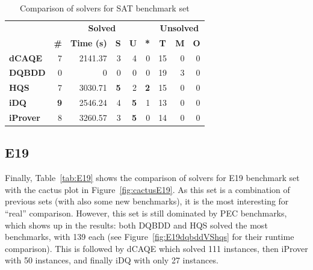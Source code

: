 \documentclass[
  digital, %
  color,
  twoside, %
  table,   %
  nolof,     %
  nolot,     %
]{fithesis3}
\theoremstyle{definition}
\theoremstyle{remark}
\begin{document}
\begin{table}[ht]
\centering
\caption{Comparison of solvers for SAT benchmark set}%
\label{tab:SAT}
\begin{tabular}{|l|r|r|r|r|r|r|r|r|}
\hline
\multicolumn{1}{|c|}{}                                  & \multicolumn{5}{c|}{\textbf{Solved}}                                                                                                                                        & \multicolumn{3}{c|}{\textbf{Unsolved}}                                                                 \\  \hhline{~*{8}{-}}
\multicolumn{1}{|c|}{\multirow{-2}{*}{\textbf{Solver}}} & \multicolumn{1}{c|}{\textbf{\#}} & \multicolumn{1}{c|}{\textbf{Time (s)}} & \multicolumn{1}{c|}{\textbf{S}} & \multicolumn{1}{c|}{\textbf{U}} & \multicolumn{1}{c|}{\textbf{*}} & \multicolumn{1}{c|}{\textbf{T}} & \multicolumn{1}{c|}{\textbf{M}} & \multicolumn{1}{c|}{\textbf{O}} \\ \hline
\textbf{dCAQE} & \phantom{0}\num{7} & \num{2141.37} & \phantom{0}\num{3} & \phantom{0}\num{4} & \phantom{0}\num{0} & \num{15} & \phantom{0}\num{0} & \phantom{0}\num{0} \\ \hline
\textbf{DQBDD} & \num{0} & \num{0} & \num{0} & \num{0} & \num{0} & \num{19} & \num{3} & \num{0} \\ \hline
\textbf{HQS} & \num{7} & \num{3030.71} & \textbf{5} & \num{2} & \textbf{2} & \num{15} & \num{0} & \num{0} \\ \hline
\textbf{iDQ} & \textbf{9} & \num{2546.24} & \num{4} & \textbf{5} & \num{1} & \num{13} & \num{0} & \num{0} \\ \hline
\textbf{iProver} & \num{8} & \num{3260.57} & \num{3} & \textbf{5} & \num{0} & \num{14} & \num{0} & \num{0} \\ \hline
\end{tabular}
\end{table}

\subsection{E19}
Finally, Table~\ref{tab:E19} shows the comparison of solvers for E19 benchmark set with the cactus plot in Figure~\ref{fig:cactusE19}. As this set is a combination of previous sets (with also some new benchmarks), it is the most interesting for ``real'' comparison. However, this set is still dominated by PEC benchmarks, which shows up in the results: both DQBDD and HQS solved the most benchmarks, with 139 each (see Figure~\ref{fig:E19dqbddVShqs} for their runtime comparison). This is followed by dCAQE which solved 111 instances, then iProver with 50 instances, and finally iDQ with only 27 instances.
\end{document}
